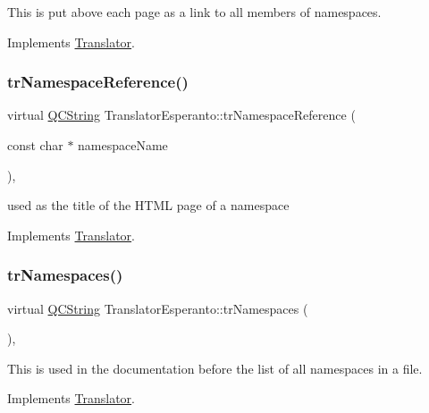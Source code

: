 This is put above each page as a link to all members of namespaces. 

Implements \mbox{\hyperlink{class_translator}{Translator}}.

\mbox{\label{class_translator_esperanto_af566bb9ce7b942aca9791d3a2cfaceba}} 
\subsubsection{\texorpdfstring{trNamespaceReference()}{trNamespaceReference()}}
{\footnotesize\ttfamily virtual \mbox{\hyperlink{class_q_c_string}{Q\+C\+String}} Translator\+Esperanto\+::tr\+Namespace\+Reference (\begin{DoxyParamCaption}\item[{const char $\ast$}]{namespace\+Name }\end{DoxyParamCaption})\hspace{0.3cm}{\ttfamily [inline]}, {\ttfamily [virtual]}}

used as the title of the H\+T\+ML page of a namespace 

Implements \mbox{\hyperlink{class_translator}{Translator}}.

\mbox{\label{class_translator_esperanto_a2d4be8d79a33fedbea3692d1599651fa}} 
\subsubsection{\texorpdfstring{trNamespaces()}{trNamespaces()}}
{\footnotesize\ttfamily virtual \mbox{\hyperlink{class_q_c_string}{Q\+C\+String}} Translator\+Esperanto\+::tr\+Namespaces (\begin{DoxyParamCaption}{ }\end{DoxyParamCaption})\hspace{0.3cm}{\ttfamily [inline]}, {\ttfamily [virtual]}}

This is used in the documentation before the list of all namespaces in a file. 

Implements \mbox{\hyperlink{class_translator}{Translator}}.

